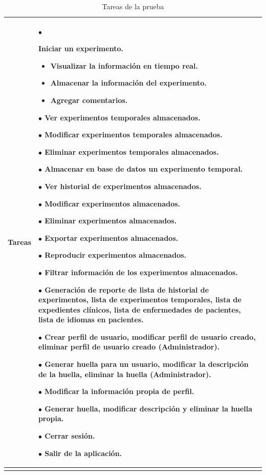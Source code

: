 \begin{longtable}{||p{2cm}|p{12cm}||}
\hline
{Tareas}&{$\bullet$ {Iniciar un experimento.
		
		\begin{itemize}
			\item Visualizar la información en tiempo real.
			\item Almacenar la información del experimento.
			\item Agregar comentarios.
		\end{itemize}}
	
	$\bullet$ Ver experimentos temporales almacenados.

	$\bullet$ Modificar experimentos temporales almacenados.
	
	$\bullet$ Eliminar experimentos temporales almacenados.

	$\bullet$ Almacenar en base de datos un experimento temporal.
	
	$\bullet$ Ver historial de experimentos almacenados.

	$\bullet$ Modificar experimentos almacenados.

	$\bullet$ Eliminar experimentos almacenados.

	$\bullet$ Exportar experimentos almacenados.

	$\bullet$ Reproducir experimentos almacenados.

	$\bullet$ Filtrar información de los experimentos almacenados.

	$\bullet$ Generación de reporte de lista de historial de experimentos, lista de experimentos temporales, lista de expedientes clínicos, lista de enfermedades de pacientes, lista de idiomas en pacientes.

	$\bullet$ Crear perfil de usuario, modificar perfil de usuario creado, eliminar perfil de usuario creado (Administrador).

	$\bullet$ Generar huella para un usuario, modificar la descripción de la huella, eliminar la huella (Administrador).

	$\bullet$ Modificar la información propia de perfil.

	$\bullet$ Generar huella, modificar descripción y eliminar la huella propia.

	$\bullet$ Cerrar sesión.

	$\bullet$ Salir de la aplicación.
}\\ \hline

\caption{Tareas de la prueba}
\label{datana}
\end{longtable}

